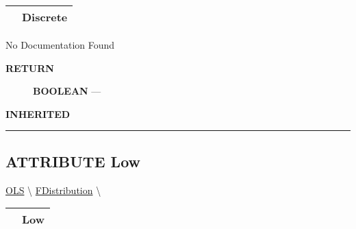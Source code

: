 {\renewcommand{\arraystretch}{1.5}
\begin{tabularx}{\textwidth}{|>{\raggedright\arraybackslash}l|X|}
\hline
\hspace{0pt}\mytexttt{\color{red} } & \textbf{Discrete} \\
\hline
\end{tabularx}
}

\par





No Documentation Found








\par
\begin{description}
\item [\colorbox{tagtype}{\color{white} \textbf{\textsf{RETURN}}}] \textbf{BOOLEAN} --- 
\end{description}






\par
\begin{description}
\item [\colorbox{tagtype}{\color{white} \textbf{\textsf{INHERITED}}}] 
\end{description}



\rule{\linewidth}{0.5pt}
\subsection*{\textsf{\colorbox{headtoc}{\color{white} ATTRIBUTE}
Low}}

\hypertarget{ecldoc:linearregression.ols.fdistribution.low}{}
\hspace{0pt} \hyperlink{ecldoc:linearregression.ols}{OLS} \textbackslash 
\hspace{0pt} \hyperlink{ecldoc:linearregression.ols.fdistribution}{FDistribution} \textbackslash 

{\renewcommand{\arraystretch}{1.5}
\begin{tabularx}{\textwidth}{|>{\raggedright\arraybackslash}l|X|}
\hline
\hspace{0pt}\mytexttt{\color{red} } & \textbf{Low} \\
\hline
\end{tabularx}
}

\par





